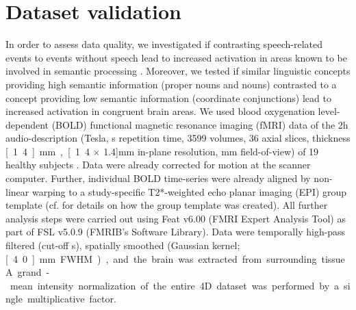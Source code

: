 \documentclass[10pt,a4paper,onecolumn]{article}
\begin{document}
\section*{Dataset validation}
In order to assess data quality, we investigated if contrasting speech-related events to events without speech lead to increased activation in areas known to be involved in semantic processing \citep{hickok2007cortical}.
Moreover, we tested if similar linguistic concepts providing high semantic information (proper nouns and nouns) contrasted to a concept providing low semantic information (coordinate conjunctions) lead to increased activation in congruent brain areas.
We used blood oxygenation level-dependent (BOLD) functional magnetic resonance imaging (fMRI) data of the 2h audio-description (\unit[7]{Tesla}, \unit[2]{s} repetition time, 3599 volumes, 36 axial slices, thickness \unit[1.4]{mm}, \unit[1.4 $\times$ 1.4]{mm} in-plane resolution, \unit[224]{mm} field-of-view) of 19 healthy subjects \citep{hanke2014audiomovie}.
Data were already corrected for motion at the scanner computer.
Further, individual BOLD time-series were already aligned by non-linear warping to a study-specific T2*-weighted echo planar imaging (EPI) group template (cf. \citep{hanke2014audiomovie} for details on how the group template was created).
All further analysis steps were carried out using Feat v6.00 (FMRI Expert Analysis Tool)\citep{woolrich2001autocorr} as part of FSL v5.0.9 (FMRIB's Software Library)\citep{smith2004fsl}.
Data were temporally high-pass filtered (cut-off \unit[150]{s}), spatially smoothed (Gaussian kernel; \unit[4.0]{mm} FWHM), and the brain was extracted from surrounding tissue.
A grand-mean intensity normalization of the entire 4D dataset was performed by a single multiplicative factor.
\end{document}
